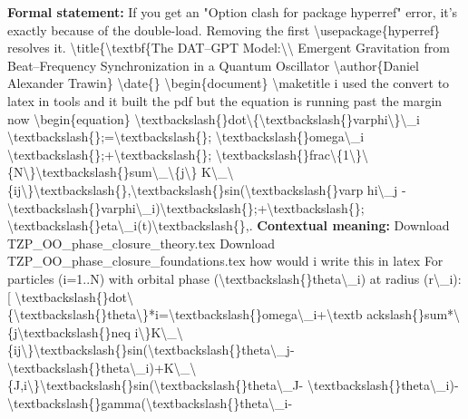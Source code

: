 \begingroup\footnotesize\setlength{\emergencystretch}{3em}\sloppy
\textbf{Formal statement:} If you get an "Option clash for package hyperref" error, it's exactly because of the double-load. Removing the first \textbackslash{}usepackage\{hyperref\} resolves it. \textbackslash{}title\{\textbackslash{}textbf\{The DAT--GPT Model:\textbackslash{}\textbackslash{} Emergent Gravitation from Beat--Frequency Synchronization in a Quantum Oscillator \textbackslash{}author\{Daniel Alexander Trawin\} \textbackslash{}date\{\} \textbackslash{}begin\{document\} \textbackslash{}maketitle i used the convert to latex in tools and it built the pdf but the equation is running past the margin now \textbackslash{}begin\{equation\} \textbackslash{}textbackslash\{\}dot\textbackslash{}\{\textbackslash{}textbackslash\{\}varphi\textbackslash{}\}\textbackslash{}\_i \textbackslash{}textbackslash\{\};=\textbackslash{}textbackslash\{\}; \textbackslash{}textbackslash\{\}omega\textbackslash{}\_i \textbackslash{}textbackslash\{\};+\textbackslash{}textbackslash\{\}; \textbackslash{}textbackslash\{\}frac\textbackslash{}\{1\textbackslash{}\}\textbackslash{} \{N\textbackslash{}\}\textbackslash{}textbackslash\{\}sum\textbackslash{}\_\textbackslash{}\{j\textbackslash{}\} K\textbackslash{}\_\textbackslash{} \{ij\textbackslash{}\}\textbackslash{}textbackslash\{\},\textbackslash{}textbackslash\{\}sin(\textbackslash{}textbackslash\{\}varp hi\textbackslash{}\_j - \textbackslash{}textbackslash\{\}varphi\textbackslash{}\_i)\textbackslash{}textbackslash\{\};+\textbackslash{}textbackslash\{\}; \textbackslash{}textbackslash\{\}eta\textbackslash{}\_i(t)\textbackslash{}textbackslash\{\},.
\textbf{Contextual meaning:} Download TZP\_OO\_phase\_closure\_theory.tex Download TZP\_OO\_phase\_closure\_foundations.tex how would i write this in latex For particles (i=1..N) with orbital phase (\textbackslash{}textbackslash\{\}theta\textbackslash{}\_i) at radius (r\textbackslash{}\_i): [ \textbackslash{}textbackslash\{\}dot\textbackslash{} \{\textbackslash{}textbackslash\{\}theta\textbackslash{}\}*i=\textbackslash{}textbackslash\{\}omega\textbackslash{}\_i+\textbackslash{}textb ackslash\{\}sum*\textbackslash{}\{j\textbackslash{}textbackslash\{\}neq i\textbackslash{}\}K\textbackslash{}\_\textbackslash{} \{ij\textbackslash{}\}\textbackslash{}textbackslash\{\}sin(\textbackslash{}textbackslash\{\}theta\textbackslash{}\_j- \textbackslash{}textbackslash\{\}theta\textbackslash{}\_i)+K\textbackslash{}\_\textbackslash{} \{J,i\textbackslash{}\}\textbackslash{}textbackslash\{\}sin(\textbackslash{}textbackslash\{\}theta\textbackslash{}\_J- \textbackslash{}textbackslash\{\}theta\textbackslash{}\_i)- \textbackslash{}textbackslash\{\}gamma(\textbackslash{}textbackslash\{\}theta\textbackslash{}\_i-

